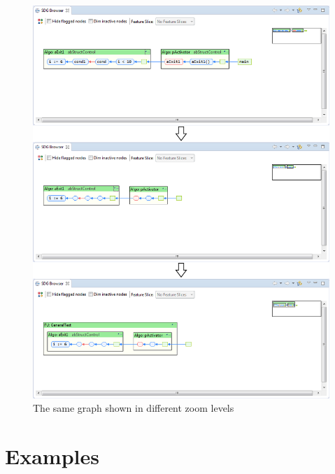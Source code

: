\begin{figure}[p]
  \centering
    \includegraphics[width=\textwidth]{bilder/manual-zoom}
  \caption{The same graph shown in different zoom levels}
  \label{fig:manual-zoom}
\end{figure}


\section{Examples} \label{sec:manual-examples}



